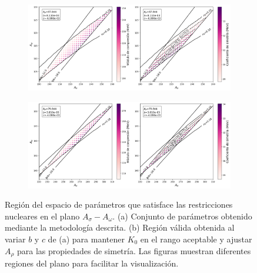 \begin{figure}[h]
    \centering
    \begin{subfigure}{\linewidth}
        \centering
        \includegraphics[width=0.85\linewidth]{Figuras/ejemplo_espacio_1}
        \caption{}
        \label{fig:region_nuclear_a}
    \end{subfigure}
    
    \begin{subfigure}{\linewidth}
        \centering
        \includegraphics[width=0.85\linewidth]{Figuras/ejemplo_espacio_2}
        \caption{}
        \label{fig:region_nuclear_b}
    \end{subfigure}
    \caption[Regiones del espacio de parámetros que satisfacen las restricciones nucleares]{Región del espacio de parámetros que satisface las restricciones nucleares en el plano $A_\sigma - A_\omega$. (a) Conjunto de parámetros obtenido mediante la metodología descrita. (b) Región válida obtenida al variar $b$ y $c$ de (a) para mantener $K_0$ en el rango aceptable y ajustar $A_\rho$ para las propiedades de simetría. Las figuras muestran diferentes regiones del plano para facilitar la visualización.}
    \label{fig:region_nuclear}
\end{figure}

